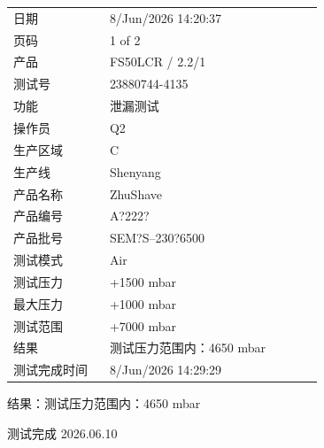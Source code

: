 \documentclass[UTF8,10pt,a4paper,fontset=fandol]{ctexart}
\newcommand{\fieldvalue}[1]{#1}
\newcommand{\handwritten}[1]{#1}
\begin{document}
\begin{tabular}{@{}p{0.28\linewidth}p{0.62\linewidth}@{}}
日期 &
\fieldvalue{8/Jun/2026 14:20:37}
\\
页码 &
\fieldvalue{1 of 2}
\\
产品 &
\fieldvalue{FS50LCR / 2.2/1}
\\
测试号 &
\fieldvalue{23880744-4135}
\\
功能 &
\fieldvalue{泄漏测试}
\\
操作员 &
\fieldvalue{Q2}
\\
生产区域 &
\fieldvalue{C}
\\
生产线 &
\fieldvalue{Shenyang}
\\
产品名称 &
\fieldvalue{ZhuShave}
\\
产品编号 &
\fieldvalue{A?222?}
\\
产品批号 &
\fieldvalue{SEM?S--230?6500}
\\
测试模式 &
\fieldvalue{Air}
\\
测试压力 &
\fieldvalue{+1500 mbar}
\\
最大压力 &
\fieldvalue{+1000 mbar}
\\
测试范围 &
\fieldvalue{+7000 mbar}
\\
结果 &
\fieldvalue{测试压力范围内：4650 mbar}
\\
测试完成时间 &
\fieldvalue{8/Jun/2026 14:29:29}
\end{tabular}

\vspace{1em}

结果：测试压力范围内：4650 mbar

\handwritten{测试完成 2026.06.10}
\end{document}
